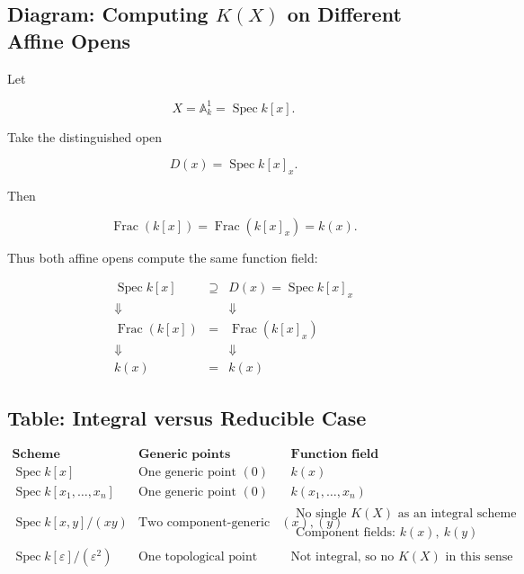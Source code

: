 \documentclass[12pt,a4paper]{article}
\theoremstyle{notespace}
\begin{document}
\subsection{Diagram: Computing \(K(X)\) on Different Affine Opens}

Let

\[
X=\mathbb{A}^1_k=\operatorname{Spec}k[x].
\]

Take the distinguished open

\[
D(x)=\operatorname{Spec}k[x]_x.
\]

Then

\[
\operatorname{Frac}(k[x])
=
\operatorname{Frac}(k[x]_x)
=
k(x).
\]

Thus both affine opens compute the same function field:

\[
\begin{array}{ccc}
	\operatorname{Spec}k[x]
	& \supseteq &
	D(x)=\operatorname{Spec}k[x]_x
	\\[0.5em]
	\Downarrow & & \Downarrow
	\\[0.5em]
	\operatorname{Frac}(k[x])
	& = &
	\operatorname{Frac}(k[x]_x)
	\\[0.5em]
	\Downarrow & & \Downarrow
	\\[0.5em]
	k(x)
	& = &
	k(x)
\end{array}
\]

\subsection{Table: Integral versus Reducible Case}

\[
\begin{array}{c|c|c}
	\textbf{Scheme}
	& \textbf{Generic points}
	& \textbf{Function field}
	\\
	\hline
	\operatorname{Spec}k[x]
	&
	\text{One generic point } (0)
	&
	k(x)
	\\
	\hline
	\operatorname{Spec}k[x_1,\dots,x_n]
	&
	\text{One generic point } (0)
	&
	k(x_1,\dots,x_n)
	\\
	\hline
	\operatorname{Spec}k[x,y]/(xy)
	&
	\text{Two component-generic points } (x),(y)
	&
	\begin{array}{c}
		\text{No single } K(X) \text{ as an integral scheme} \\
		\text{Component fields: } k(x),\ k(y)
	\end{array}
	\\
	\hline
	\operatorname{Spec}k[\varepsilon]/(\varepsilon^2)
	&
	\text{One topological point}
	&
	\text{Not integral, so no } K(X) \text{ in this sense}
\end{array}
\]
\end{document}
